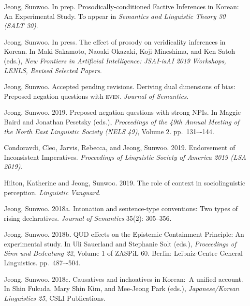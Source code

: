 \documentclass[letterpaper]{article}
\renewenvironment{itemize}{
  \begin{list}{}{
    \setlength{\leftmargin}{1.5em}
  }
}{
  \end{list}
}
\begin{document}
\begin{itemize}

\item Jeong, Sunwoo. In prep. Prosodically-conditioned Factive Inferences in Korean: An Experimental Study. To appear in \emph{Semantics and Linguistic Theory 30 (SALT 30)}.

\item Jeong, Sunwoo. In press. The effect of prosody on veridicality inferences in Korean. In Maki Sakamoto, Naoaki Okazaki, Koji Mineshima, and Ken Satoh (eds.), \emph{New Frontiers in Artificial Intelligence: JSAI-isAI 2019 Workshops, LENLS, Revised Selected Papers}.

\item Jeong, Sunwoo. Accepted pending revisions. Deriving dual dimensions of bias: Preposed negation questions with \textsc{even}. \emph{Journal of Semantics}.

\item Jeong, Sunwoo. 2019. Preposed negation questions with strong NPIs. In Maggie Baird and Jonathan Pesetsky (eds.), \emph{Proceedings of the 49th Annual Meeting of the North East Linguistic Society (NELS 49)}, Volume 2. pp.~131–-144.

\item Condoravdi, Cleo, Jarvis, Rebecca, and Jeong, Sunwoo. 2019. Endorsement of Inconsistent Imperatives. \emph{Proceedings of Linguistic Society of America 2019 (LSA 2019)}.

\item Hilton, Katherine and Jeong, Sunwoo. 2019. The role of context in sociolinguistic perception. \emph{Linguistic Vanguard}.

\item Jeong, Sunwoo. 2018a. Intonation and sentence-type conventions: Two types of rising declaratives. \emph{Journal of Semantics} 35(2): 305--356.

\item Jeong, Sunwoo. 2018b. QUD effects on the Epistemic Containment Principle: An experimental study. In Uli Sauerland and Stephanie Solt (eds.), \emph{Proceedings of Sinn und Bedeutung 22}, Volume 1 of ZASPiL 60. Berlin: Leibniz-Centre General Linguistics. pp.~487–-504.

\item Jeong, Sunwoo. 2018c. Causatives and inchoatives in Korean:\ A unified account. In Shin Fukuda, Mary Shin Kim, and Mee-Jeong Park (eds.), \emph{Japanese/Korean Linguistics 25}, CSLI Publications.


\end{itemize}
\end{document}
